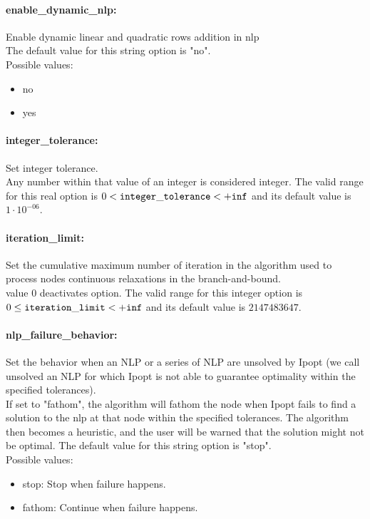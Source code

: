 \paragraph{enable\_dynamic\_nlp:}\label{opt:enable_dynamic_nlp} Enable dynamic linear and quadratic rows addition in nlp \\
The default value for this string option is "no".
\\ 
Possible values:
\begin{itemize}
   \item no
   \item yes
\end{itemize}

\paragraph{integer\_tolerance:}\label{opt:integer_tolerance} Set integer tolerance. \\
 Any number within that value of an integer is considered integer. The valid range for this real option is 
$0 <  {\tt integer\_tolerance } <  {\tt +inf}$
and its default value is $1 \cdot 10^{-06}$.


\paragraph{iteration\_limit:}\label{opt:iteration_limit} Set the cumulative maximum number of iteration in the algorithm used to process nodes continuous relaxations in the branch-and-bound. \\
 value 0 deactivates option. The valid range for this integer option is
$0 \le {\tt iteration\_limit } <  {\tt +inf}$
and its default value is $2147483647$.


\paragraph{nlp\_failure\_behavior:}\label{opt:nlp_failure_behavior} Set the behavior when an NLP or a series of NLP are unsolved by Ipopt (we call unsolved an NLP for which Ipopt is not able to guarantee optimality within the specified tolerances). \\
 If set to "fathom", the algorithm will fathom the node when Ipopt fails to find a solution to the nlp at that node within the specified tolerances. The algorithm then becomes a heuristic, and the user will be warned that the solution might not be optimal. The default value for this string option is "stop".
\\ 
Possible values:
\begin{itemize}
   \item stop: Stop when failure happens.
   \item fathom: Continue when failure happens.
\end{itemize}

